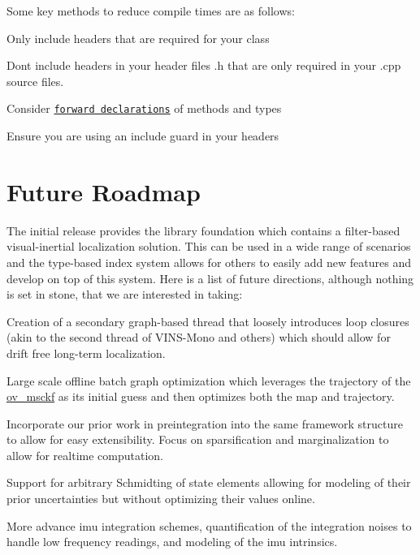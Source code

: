 Some key methods to reduce compile times are as follows\+:
\begin{DoxyItemize}
\item Only include headers that are required for your class
\item Don\textquotesingle{}t include headers in your header files {\ttfamily .h} that are only required in your {\ttfamily .cpp} source files.
\item Consider \href{https://www.wikiwand.com/en/Forward_declaration}{\tt forward declarations} of methods and types
\item Ensure you are using an include guard in your headers 
\end{DoxyItemize}\hypertarget{dev-roadmap}{}\section{Future Roadmap}\label{dev-roadmap}
The initial release provides the library foundation which contains a filter-\/based visual-\/inertial localization solution. This can be used in a wide range of scenarios and the type-\/based index system allows for others to easily add new features and develop on top of this system. Here is a list of future directions, although nothing is set in stone, that we are interested in taking\+:


\begin{DoxyItemize}
\item Creation of a secondary graph-\/based thread that loosely introduces loop closures (akin to the second thread of V\+I\+N\+S-\/\+Mono and others) which should allow for drift free long-\/term localization.
\item Large scale offline batch graph optimization which leverages the trajectory of the \hyperlink{namespaceov__msckf}{ov\+\_\+msckf} as its initial guess and then optimizes both the map and trajectory.
\item Incorporate our prior work in preintegration \cite{Eckenhoff2019IJRR} into the same framework structure to allow for easy extensibility. Focus on sparsification and marginalization to allow for realtime computation.
\item Support for arbitrary Schmidt\textquotesingle{}ing of state elements allowing for modeling of their prior uncertainties but without optimizing their values online.
\item More advance imu integration schemes, quantification of the integration noises to handle low frequency readings, and modeling of the imu intrinsics. 
\end{DoxyItemize}